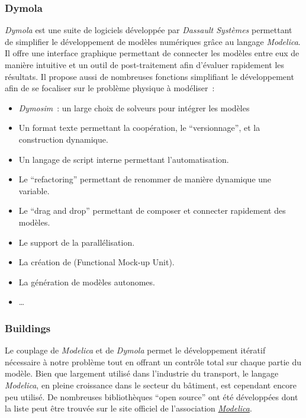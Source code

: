 \subsubsection{Dymola} %
\label{ssub:dymola}
\textit{Dymola} est une suite de logiciels développée par \textit{Dassault Systèmes}
permettant de simplifier le développement de modèles numériques grâce au langage
\textit{Modelica}. Il offre une interface graphique permettant de connecter les modèles
entre eux de manière intuitive et un outil de post-traitement afin d’évaluer rapidement
les résultats. Il propose aussi de nombreuses fonctions simplifiant le développement afin
de se focaliser sur le problème physique à modéliser~:
\begin{itemize}
    \item \textit{Dymosim}~: un large choix de solveurs pour intégrer les modèles
    \item Un format texte permettant la coopération, le \enquote{versionnage}, et la construction dynamique.
    \item Un langage de script interne permettant l’automatisation.
    \item Le \enquote{refactoring} permettant de renommer de manière dynamique une variable.
    \item Le \enquote{drag and drop} permettant de composer et connecter rapidement des modèles.
    \item Le support de la parallélisation.
    \item La création de  (Functional Mock-up Unit).
    \item La génération de modèles autonomes.
    \item \dots
\end{itemize}


\subsubsection{Buildings} %
\label{ssub:buildings}
Le couplage de \textit{Modelica} et de \textit{Dymola} permet le développement itératif
nécessaire à notre problème tout en offrant un contrôle total sur chaque partie du modèle.
Bien que largement utilisé dans l’industrie du transport, le langage \textit{Modelica},
en pleine croissance dans le secteur du bâtiment, est cependant encore peu utilisé. De
nombreuses bibliothèques \enquote{open source} ont été développées dont la liste peut être
trouvée sur le site officiel de l’association
\href{https://www.modelica.org/libraries}{\textit{Modelica}}.

